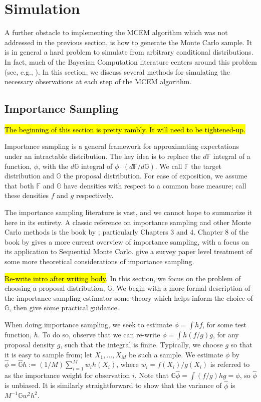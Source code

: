 \documentclass[11pt, oneside]{article}   	%
\newcommand{\bF}{\mathbb{F}}
\newcommand{\bG}{\mathbb{G}}
\begin{document}
\section{Simulation}

A further obstacle to implementing the MCEM algorithm which was not addressed in the previous section, is how to generate the Monte Carlo sample. It is in general a hard problem to simulate from arbitrary conditional distributions. In fact, much of the Bayesian Computation literature centers around this problem (see, e.g., \citealp{Gel13}). In this section, we discuss several methods for simulating the necessary observations at each step of the MCEM algorithm.

\subsection{Importance Sampling}

\hl{The beginning of this section is pretty rambly. It will need to be tightened-up.}

Importance sampling is a general framework for approximating expectations under an intractable distribution. The key idea is to replace the $d \bF$ integral of a function, $\phi$, with the $d \bG$ integral of $\phi \cdot (d \bF / d\bG)$. We call $\bF$ the target distribution and $\bG$ the proposal distribution. For ease of exposition, we assume that both $\bF$ and $\bG$ have densities with respect to a common base measure; call these densities $f$ and $g$ respectively.

The importance sampling literature is vast, and we cannot hope to summarize it here in its entirety. A classic reference on importance sampling and other Monte Carlo methods is the book by \citet{Rob04}; particularly Chapters 3 and 4. Chapter 8 of the book by \citet{Cho20} gives a more current overview of importance sampling, with a focus on its application to Sequential Monte Carlo. \citet{Aga17} give a survey paper level treatment of some more theoretical considerations of importance sampling.

\hl{Re-write intro after writing body}. In this section, we focus on the problem of choosing a proposal distribution, $\bG$. We begin with a more formal description of the importance sampling estimator some theory which helps inform the choice of $\bG$, then give some practical guidance. 

When doing importance sampling, we seek to estimate $\phi = \int h f $, for some test function, $h$. To do so, observe that we can re-write $\phi = \int h (f/g) g$, for any proposal density $g$, such that the integral is finite. Typically, we choose $g$ so that it is easy to sample from; let $X_1,\ldots,X_M$ be such a sample. We estimate $\phi$ by $\hat{\phi} = \hat{\bG} h := (1/M) \sum_{i=1}^M w_i h(X_i)$, where $w_i = f(X_i)/g(X_i)$ is referred to as the importance weight for observation $i$. Note that $\bG \hat{\phi} = \int (f/g) h g = \phi$, so  $\hat{\phi}$ is unbiased. It is similarly straightforward to show that the variance of $\hat{\phi}$ is $M^{-1} \bG w^2 h^2$. 
\end{document}
